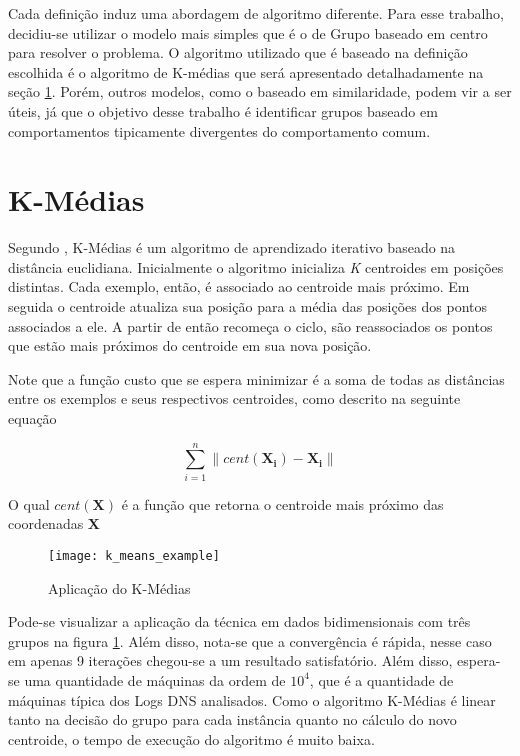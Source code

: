 Cada definição induz uma abordagem de algoritmo diferente. Para esse trabalho, decidiu-se utilizar o modelo mais simples que é o de Grupo baseado em centro para resolver o problema. O algoritmo utilizado que é baseado na definição escolhida é o algoritmo de K-médias que será apresentado detalhadamente na seção \ref{sec:kmeans}. Porém, outros modelos, como o baseado em similaridade, podem vir a ser úteis, já que o objetivo desse trabalho é identificar grupos baseado em comportamentos tipicamente divergentes do comportamento comum.

\section{K-Médias}\label{sec:kmeans}

Segundo \citet{witten2011data}, K-Médias é um algoritmo de aprendizado iterativo baseado na distância euclidiana. Inicialmente o algoritmo inicializa \textit{K} centroides em posições distintas. Cada exemplo, então, é associado ao centroide mais próximo. Em seguida o centroide atualiza sua posição para a média das posições dos pontos associados a ele. A partir de então recomeça o ciclo, são reassociados os pontos que estão mais próximos do centroide em sua nova posição.

Note que a função custo que se espera minimizar é a soma de todas as distâncias entre os exemplos e seus respectivos centroides, como descrito na seguinte equação

\[
\sum_{i=1}^{n} \lVert cent(\mathbf{X_{i}}) - \mathbf{X_{i}} \rVert
\]

O qual \(cent(\mathbf{X})\) é a função que retorna o centroide mais próximo das coordenadas \(\mathbf{X}\)

\begin{figure}
\texttt{[image: k\_means\_example]}
\caption[Aplicação do K-Médias]{Aplicação do K-Médias} \label{fig:k_means_example}
\end{figure}

Pode-se visualizar a aplicação da técnica em dados bidimensionais com três grupos na figura \ref{fig:k_means_example}. Além disso, nota-se que a convergência é rápida, nesse caso em apenas 9 iterações chegou-se a um resultado satisfatório. Além disso, espera-se uma quantidade de máquinas da ordem de \(10^4\), que é a quantidade de máquinas típica dos Logs DNS analisados. Como o algoritmo K-Médias é linear tanto na decisão do grupo para cada instância quanto no cálculo do novo centroide, o tempo de execução do algoritmo é muito baixa.

